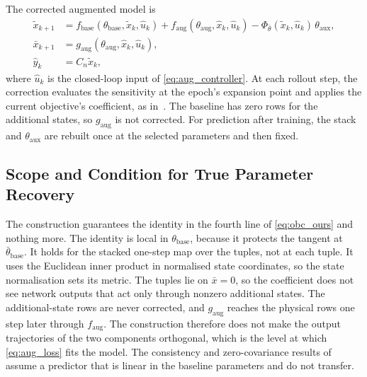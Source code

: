 The corrected augmented model is
\begin{equation}
\begin{aligned}
 \tilde x_{k+1}
 &=f_{\mathrm{base}}(\theta_{\mathrm{base}},\tilde x_k,\hat u_k)
   +f_{\mathrm{aug}}(\theta_{\mathrm{aug}},\hat x_k,\hat u_k)
   -\Phi_{\bar\theta}(\tilde x_k,\hat u_k)\,\theta_{\mathrm{aux}},\\
 \bar x_{k+1}
 &=g_{\mathrm{aug}}(\theta_{\mathrm{aug}},\hat x_k,\hat u_k),\\
 \hat y_k&=C_n\tilde x_k,
\end{aligned}
\label{eq:obc_model}
\end{equation}
where $\hat u_k$ is the closed-loop input of \eqref{eq:aug_controller}.
At each rollout step, the correction evaluates the sensitivity at the epoch's
expansion point and applies the current objective's coefficient, as
in~\cite[Eq.~(13)]{gyorok2026obc}.
The baseline has zero rows for the additional states, so $g_{\mathrm{aug}}$ is
not corrected.
For prediction after training, the stack and $\theta_{\mathrm{aux}}$ are
rebuilt once at the selected parameters and then fixed.

\subsection{Scope and Condition for True Parameter Recovery}\label{sec:obc_scope}
The construction guarantees the identity in the fourth line of
\eqref{eq:obc_ours} and nothing more.
The identity is local in $\theta_{\mathrm{base}}$, because it protects the
tangent at $\bar\theta_{\mathrm{base}}$.
It holds for the stacked one-step map over the tuples, not at each tuple.
It uses the Euclidean inner product in normalised state coordinates, so the
state normalisation sets its metric.
The tuples lie on $\bar x=0$, so the coefficient does not see network outputs
that act only through nonzero additional states.
The additional-state rows are never corrected, and $g_{\mathrm{aug}}$ reaches
the physical rows one step later through $f_{\mathrm{aug}}$.
The construction therefore does not make the output trajectories of the two
components orthogonal, which is the level at which \eqref{eq:aug_loss} fits
the model.
The consistency and zero-covariance results
of~\cite[Thms.~16, 18]{gyorok2026obc} assume a predictor that is linear in the
baseline parameters and do not transfer.

